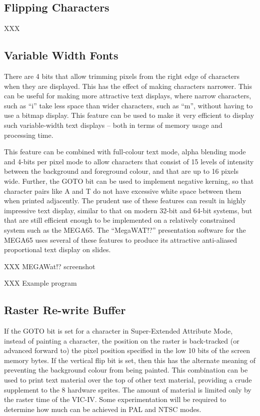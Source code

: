 \subsection{Flipping Characters}

XXX

\subsection{Variable Width Fonts}

There are 4 bits that allow trimming pixels from the right edge of characters when they are displayed. This has the effect of making
characters narrower. This can be useful for making more attractive text displays, where narrow characters, such as ``i'' take less space than wider characters, such as ``m'', without having to use a bitmap display. This feature can be used to make it very efficient to display
such variable-width text displays -- both in terms of memory usage and processing time.

This feature can be combined with full-colour text mode, alpha blending mode and 4-bits per pixel mode to allow characters that consist of
15 levels of intensity between the background and foreground colour, and that are up to 16 pixels wide.  Further, the GOTO bit can be used to implement negative kerning, so that character pairs like A and T do not have excessive white space between them when printed adjacently. The prudent use of these features can result in highly impressive text display, similar to that on modern 32-bit and 64-bit systems, but that are still efficient enough to be implemented on a relatively constrained system such as the MEGA65. The ``MegaWAT!?'' presentation software for the MEGA65 uses several of these features to produce its attractive anti-aliased proportional text display on slides.

XXX MEGAWat!? screenshot

XXX Example program

\subsection{Raster Re-write Buffer}

If the GOTO bit is set for a character in Super-Extended Attribute Mode, instead of painting a character, the position on the raster is back-tracked (or advanced forward to) the
pixel position specified in the low 10 bits of the screen memory bytes.  If the vertical flip bit is set, then this has the alternate
meaning of preventing the background colour from being painted.  This combination can be used to print text material over the top of
other text material, providing a crude supplement to the 8 hardware sprites.  The amount of material is limited only by the raster
time of the VIC-IV. Some experimentation will be required to determine how much can be achieved in PAL and NTSC modes.

